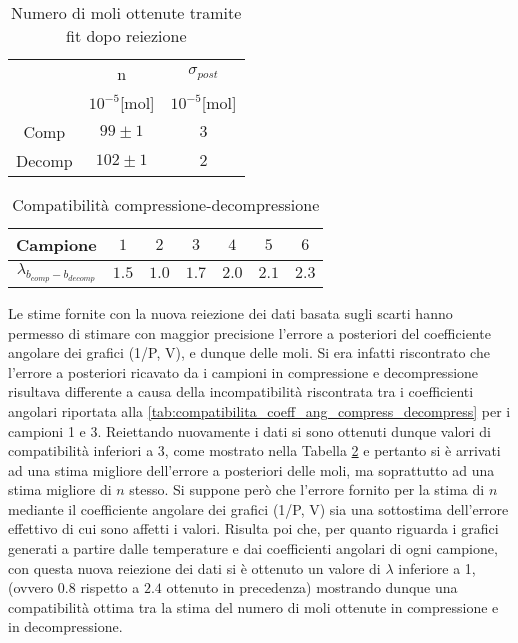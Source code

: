 \documentclass[a4paper,11pt,oneside]{article}
\begin{document}
\begin{table}[h!]
    \centering
    \begin{tabular}{|c|c|c|}
        \hline
        & n & $\sigma_{post}$\\
        & $10^{-5}$[mol] & $10^{-5}$[mol]\\ \hline
        \rowcolor[rgb]{0.85,0.85,0.85}Comp & $99\pm1$ & $3$\\ \hline
        Decomp & $102\pm1$ & $2$\\ \hline
    \end{tabular}
    \caption{Numero di moli ottenute tramite fit dopo reiezione}
    \label{tab:moli_fit_reiez}
\end{table}

\begin{table}[h!]
\centering
\begin{tabular}{|c|c|c|c|c|c|c|}
    \hline
    \textbf{Campione} & $1$ & $2$ & $3$ & $4$ & $5$ & $6$ \\ \hline
    \rowcolor[rgb]{0.85,0.85,0.85}$\lambda_{b_{comp}-b_{decomp}}$ & $1.5$ & $1.0$ & $1.7$ & $2.0$ & $2.1$ & $2.3$ \\ \hline
    \end{tabular}
\caption{Compatibilità compressione-decompressione}
\label{tab:compatibilita_coeff_ang_compress_decompress_nuovo}
\end{table}

\newpage
Le stime fornite con la nuova reiezione dei dati basata sugli scarti hanno permesso di stimare con maggior precisione l'errore a posteriori del coefficiente angolare dei grafici (1/P, V), e dunque delle moli. Si era infatti riscontrato che l'errore a posteriori ricavato da i campioni in compressione e decompressione risultava differente a causa della incompatibilità riscontrata tra i coefficienti angolari riportata alla \ref{tab:compatibilita_coeff_ang_compress_decompress} per i campioni 1 e 3. Reiettando nuovamente i dati si sono ottenuti dunque valori di compatibilità inferiori a 3, come mostrato nella Tabella \ref{tab:compatibilita_coeff_ang_compress_decompress_nuovo} e pertanto si è arrivati ad una stima migliore dell'errore a posteriori delle moli, ma soprattutto ad una stima migliore di $n$ stesso. Si suppone però che l'errore fornito per la stima di $n$ mediante il coefficiente angolare dei grafici (1/P, V) sia una sottostima dell'errore effettivo di cui sono affetti i valori.
Risulta poi che, per quanto riguarda i grafici generati a partire dalle temperature e dai coefficienti angolari di ogni campione, con questa nuova reiezione dei dati si è ottenuto un valore di $\lambda$ inferiore a 1, (ovvero $0.8$ rispetto a $2.4$ ottenuto in precedenza) mostrando dunque una compatibilità ottima tra la stima del numero di moli ottenute in compressione e in decompressione.\newline
\end{document}

